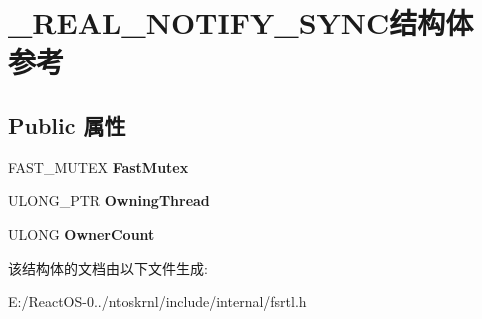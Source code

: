 \hypertarget{struct___r_e_a_l___n_o_t_i_f_y___s_y_n_c}{}\section{\+\_\+\+R\+E\+A\+L\+\_\+\+N\+O\+T\+I\+F\+Y\+\_\+\+S\+Y\+N\+C结构体 参考}
\label{struct___r_e_a_l___n_o_t_i_f_y___s_y_n_c}
\subsection*{Public 属性}
\begin{DoxyCompactItemize}
\item 
\mbox{\label{struct___r_e_a_l___n_o_t_i_f_y___s_y_n_c_af617c66fa131fcec957d0cf19ca1a6fa}} 
F\+A\+S\+T\+\_\+\+M\+U\+T\+EX {\bfseries Fast\+Mutex}
\item 
\mbox{\label{struct___r_e_a_l___n_o_t_i_f_y___s_y_n_c_a141bf7d0b4e8b5c8a0a724d9fe3575da}} 
U\+L\+O\+N\+G\+\_\+\+P\+TR {\bfseries Owning\+Thread}
\item 
\mbox{\label{struct___r_e_a_l___n_o_t_i_f_y___s_y_n_c_a9fb66f1bf103ee0861c1c902556d3621}} 
U\+L\+O\+NG {\bfseries Owner\+Count}
\end{DoxyCompactItemize}


该结构体的文档由以下文件生成\+:\begin{DoxyCompactItemize}
\item 
E\+:/\+React\+O\+S-\/0../ntoskrnl/include/internal/fsrtl.\+h\end{DoxyCompactItemize}
